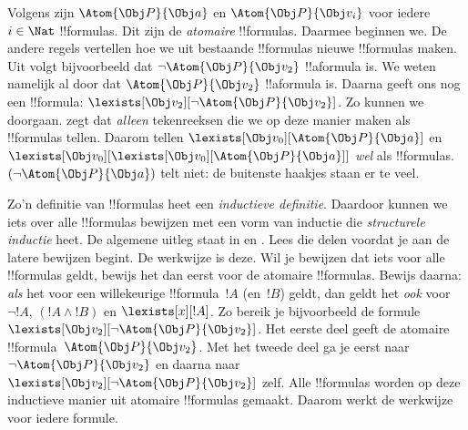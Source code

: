 \documentclass[../../../include/open-logic-section]{subfiles}
\begin{document}
Volgens  zijn $\Atom{\Obj P}{\Obj a}$ en
$\Atom{\Obj P}{\Obj v_i}$ voor iedere $i \in \Nat$ !!{formula}s. Dit
zijn de \emph{atomaire} !!{formula}s. Daarmee beginnen we. De andere
regels vertellen hoe we uit bestaande !!{formula}s nieuwe
!!{formula}s maken. Uit  volgt bijvoorbeeld dat
$\lnot \Atom{\Obj P}{\Obj v_2}$ !!a{formula} is. We weten namelijk al
door  dat $\Atom{\Obj P}{\Obj v_2}$ !!a{formula} is.
Daarna geeft  ons nog een !!{formula}:
$\lexists[\Obj v_2][\lnot \Atom{\Obj P}{\Obj v_2}]$. Zo kunnen we
doorgaan.  zegt dat \emph{alleen} tekenreeksen die
we op deze manier maken als !!{formula}s tellen. Daarom tellen
$\lexists[\Obj v_0][\Atom{\Obj P}{\Obj a}]$ en $\lexists[\Obj
v_0][\lexists[\Obj v_0][\Atom{\Obj P}{\Obj a}]]$ \emph{wel} als
!!{formula}s. $(\lnot \Atom{\Obj P}{\Obj a})$ telt niet: de buitenste
haakjes staan er te veel.

Zo'n definitie van !!{formula}s heet een \emph{inductieve definitie}.
Daardoor kunnen we iets over alle !!{formula}s bewijzen met een vorm
van inductie die \emph{structurele inductie} heet. De algemene uitleg
staat in  en .
Lees die delen voordat je aan de latere bewijzen begint. De werkwijze
is deze. Wil je bewijzen dat iets voor alle !!{formula}s geldt, bewijs
het dan eerst voor de atomaire !!{formula}s. Bewijs daarna: \emph{als}
het voor een willekeurige !!{formula}~$!A$ (en~$!B$) geldt, dan geldt
het \emph{ook} voor $\lnot !A$, $(!A \land !B)$ en
$\lexists[x][!A]$. Zo bereik je bijvoorbeeld de formule
$\lexists[\Obj v_2][\lnot \Atom{\Obj P}{\Obj v_2}]$. Het eerste deel
geeft de atomaire !!{formula}~$\Atom{\Obj P}{\Obj v_2}$. Met het
tweede deel ga je eerst naar $\lnot \Atom{\Obj P}{\Obj v_2}$ en daarna
naar $\lexists[\Obj v_2][\lnot \Atom{\Obj P}{\Obj v_2}]$ zelf. Alle
!!{formula}s worden op deze inductieve manier uit atomaire
!!{formula}s gemaakt. Daarom werkt de werkwijze voor iedere formule.
\end{document}
